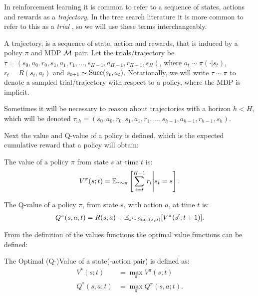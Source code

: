     In reinforcement learning it is common to refer to a sequence of states, actions and rewards as a \textit{trajectory}. In the tree search literature it is more common to refer to this as a \textit{trial} , so we will use these terms interchangeably.
    
    \begin{defn}
        \label{def:trajectory}
        A \textnormal{trajectory}, is a sequence of state, action and rewards, that is induced by a policy $\pi$ and MDP $\mathcal{M}$ pair. Let the trials/trajectory be $\tau = (s_0, a_0, r_0, s_1, a_1, r_1, ..., s_{H-1}, a_{H-1}, r_{H-1}, s_H)$, where $a_t \sim \pi(\cdot|s_t)$, $r_t=R(s_t,a_t)$ and $s_{t+1} \sim \textnormal{Succ}(s_t,a_t)$. Notationally, we will write $\tau\sim\pi$ to denote a sampled trial/trajectory with respect to a policy, where the MDP is implicit.

        Sometimes it will be necessary to reason about trajectories with a horizon $h<H$, which will be denoted $\tau_{:h} = (s_0, a_0, r_0, s_1, a_1, r_1, ..., s_{h-1}, a_{h-1}, r_{h-1}, s_h)$.
    \end{defn}

    Next the value and Q-value of a policy is defined, which is the expected cumulative reward that a policy will obtain:
    \begin{defn}
        \label{def:value}
        \label{def:q_value}
        The \textnormal{value} of a policy $\pi$ from state $s$ at time $t$ is:
        \begin{align}
            V^{\pi}(s;t) = \mathbb{E}_{\tau\sim\pi}\left[\sum_{i=t}^{H-1} r_t \Bigg| s_t=s \right].
        \end{align} 

        The \textnormal{Q-value} of a policy $\pi$, from state $s$, with action $a$, at time $t$ is:
        \begin{align}
            Q^{\pi}(s,a;t) = R(s,a) + \mathbb{E}_{s'\sim \textnormal{Succ}(s,a)} [V^{\pi}(s';t+1)].
        \end{align} 
    \end{defn}

    From the definition of the values functions the optimal value functions can be defined:
    \begin{defn}
        \label{def:optimal_value}
        \label{def:optimal_q_value}
        The \textnormal{Optimal (Q-)Value} of a state(-action pair) is defined as:
        \begin{align}
            V^*(s;t) &= \max_{\pi} V^{\pi}(s;t) \\
            Q^*(s,a;t) &= \max_{\pi} Q^{\pi}(s,a;t).
        \end{align}
    \end{defn}

